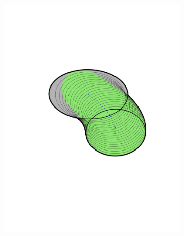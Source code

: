 \begin{figure}
  \begin{subfigure}[c]{0.3\textwidth}
    \includegraphics[width=\textwidth, trim={0cm 4cm 0cm
      4cm}]{figures/method/FunnelSimnew4}
  \end{subfigure}
  \begin{subfigure}[c]{0.3\textwidth}

\end{subfigure}
\end{figure}
